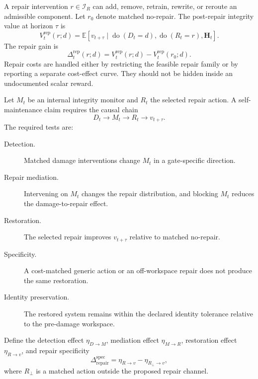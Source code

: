 A repair intervention \(r\in\mathcal I_R\) can add, remove, retrain, rewrite,
or reroute an admissible component. Let \(r_0\) denote matched no-repair. The
post-repair integrity value at horizon \(\tau\) is
\[
V_t^{\mathrm{rep}}(r;d)
=
\mathbb E
\left[
v_{t+\tau}
\mid
\operatorname{do}(D_t=d),
\operatorname{do}(R_t=r),
\mathbf H_t
\right].
\]
The repair gain is
\[
\Delta_t^{\mathrm{rep}}(r;d)
=
V_t^{\mathrm{rep}}(r;d)
-
V_t^{\mathrm{rep}}(r_0;d).
\]
Repair costs are handled either by restricting the feasible repair family or
by reporting a separate cost-effect curve. They should not be hidden inside
an undocumented scalar reward.


Let \(M_t\) be an internal integrity monitor and \(R_t\) the selected repair
action. A self-maintenance claim requires the causal chain
\[
D_t
\longrightarrow
M_t
\longrightarrow
R_t
\longrightarrow
v_{t+\tau}.
\]
The required tests are:
\begin{description}
\item[Detection.]
Matched damage interventions change \(M_t\) in a gate-specific direction.

\item[Repair mediation.]
Intervening on \(M_t\) changes the repair distribution, and blocking \(M_t\)
reduces the damage-to-repair effect.

\item[Restoration.]
The selected repair improves \(v_{t+\tau}\) relative to matched no-repair.

\item[Specificity.]
A cost-matched generic action or an off-workspace repair does not produce the
same restoration.

\item[Identity preservation.]
The restored system remains within the declared identity tolerance relative to
the pre-damage workspace.
\end{description}

Define the detection effect \(\eta_{D\to M}\), mediation effect
\(\eta_{M\to R}\), restoration effect \(\eta_{R\to v}\), and repair
specificity
\[
\Delta_{\mathrm{repair}}^{\mathrm{spec}}
=
\eta_{R\to v}
-
\eta_{R_\perp\to v},
\]
where \(R_\perp\) is a matched action outside the proposed repair channel.


